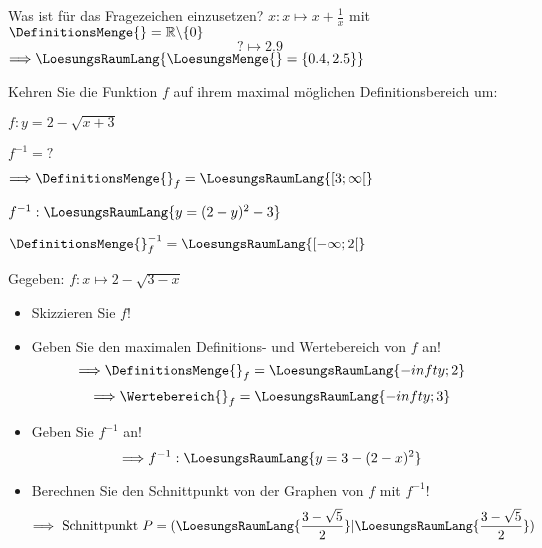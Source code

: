 \begin{bbwAufgabenBlock}
\item Was ist für das Fragezeichen einzusetzen? $x: x \mapsto x+\frac1x$ mit $\DefinitionsMenge{}
= \mathbb{R}\backslash \{0\}$
$$? \mapsto 2.9$$
$\Longrightarrow \LoesungsRaumLang{\LoesungsMenge{} = \{0.4, 2.5\}}$

\item Kehren Sie die Funktion $f$ auf ihrem maximal möglichen
Definitionsbereich um:

$f: y=2-\sqrt{x+3}$

$f^{-1} = ?$


$\Longrightarrow \DefinitionsMenge{}_f = \LoesungsRaumLang{[3;\infty[}$

$f^{-1}: \LoesungsRaumLang{y = (2-y)^2 - 3}$

$\DefinitionsMenge{}_f^{-1} = \LoesungsRaumLang{[-\infty; 2[}$


\item Gegeben: $f: x\mapsto 2-\sqrt{3-x}$

\begin{itemize}
\item Skizzieren Sie $f$!
\item Geben Sie den maximalen Definitions- und Wertebereich von $f$ an!
  $$\Longrightarrow \DefinitionsMenge{}_f = \LoesungsRaumLang{-infty;2}$$
  $$\Longrightarrow \Wertebereich{}_f = \LoesungsRaumLang{-infty;3}$$
\item Geben Sie $f^{-1}$ an!
  $$\Longrightarrow f^{-1}: \LoesungsRaumLang{y=3-(2-x)^2}$$
\item Berechnen Sie den Schnittpunkt von der Graphen von $f$ mit
$f^{-1}$!
  $$\Longrightarrow \textrm{ Schnittpunkt } P=(\LoesungsRaumLang{\frac{3-\sqrt{5}}2}|\LoesungsRaumLang{\frac{3-\sqrt{5}}2})$$

\end{itemize}
\end{bbwAufgabenBlock}

\platzFuerBerechnungenBisEndeSeite{}


\platzFuerBerechnungenBisEndeSeite{}



